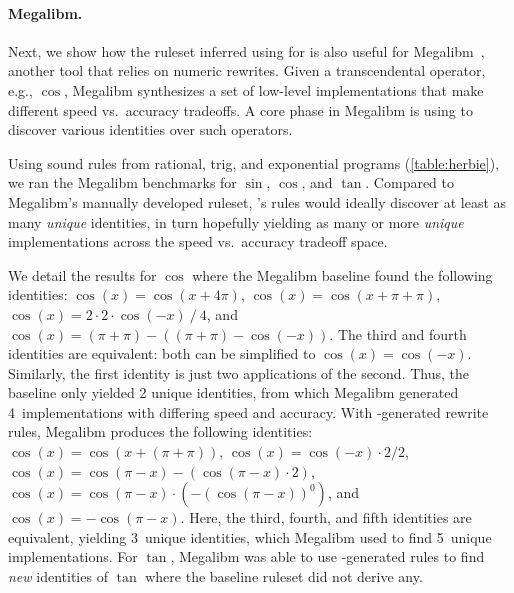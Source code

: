 
\newcommand{\baselineCosImpls}{16~}
\newcommand{\baselineCosUnique}{4~}
\newcommand{\baselineCosUniqueIds}{2~}

\newcommand{\enumoCosImpls}{8~}
\newcommand{\enumoCosUnique}{5~}
\newcommand{\enumoCosUniqueIds}{3~}

\paragraph*{Megalibm.}
Next, we show how the
  ruleset inferred using \enumo for \herbie
  is also useful for
  Megalibm~\citep{megalibm}, another \eqsat
  tool that relies on numeric rewrites.
Given a transcendental operator,
  e.g., $\cos$,
  Megalibm synthesizes a set of low-level implementations
  that make different speed vs.\ accuracy tradeoffs.
A core phase in Megalibm
  is using \eqsat to discover various
  identities over such operators.

Using sound rules from
  rational, trig, and exponential \enumo programs (\autoref{table:herbie}),
  we ran the Megalibm benchmarks for $\sin$, $\cos$, and $\tan$.
Compared to Megalibm's manually developed ruleset,
  \enumo's rules would ideally discover
  at least as many \textit{unique} identities, in turn
  hopefully yielding as many or more \textit{unique}
  implementations across the speed vs.\ accuracy tradeoff space.

We detail the results for $\cos$ where
  the Megalibm baseline found the following identities:
  $\cos(x) = \cos(x + 4\pi)$,
  $\cos(x) = \cos(x + \pi + \pi)$,
  $\cos(x) = 2\cdot2\cdot \cos(-x) ~/~ 4$, and
  $\cos(x) = (\pi+\pi) - ((\pi+\pi) - \cos(-x))$.
The third and fourth identities are equivalent:
  both can be simplified to $\cos(x) = \cos(-x)$.
Similarly, the first identity
  is just two applications of the second.
Thus, the baseline only yielded 2 unique identities,
  from which Megalibm generated
  \baselineCosUnique implementations
  with differing speed and accuracy.
With \enumo-generated rewrite rules,
  Megalibm produces the following identities:
  $\cos(x) = \cos(x + (\pi + \pi))$,
  $\cos(x) = \cos(-x) \cdot 2 / 2$,
  $\cos(x) = \cos(\pi - x) - (\cos(\pi - x) \cdot 2)$,
  $\cos(x) = \cos(\pi - x) \cdot (- (\cos(\pi - x))^0)$, and
  $\cos(x) = -\cos(\pi - x)$.
Here, the third, fourth, and fifth identities are equivalent,
  yielding \enumoCosUniqueIds unique identities,
  which Megalibm used to find \enumoCosUnique unique implementations.
For $\tan$, Megalibm was able to use
  \enumo-generated rules to find
  \textit{new} identities of $\tan$
  where the baseline ruleset did not derive any.

